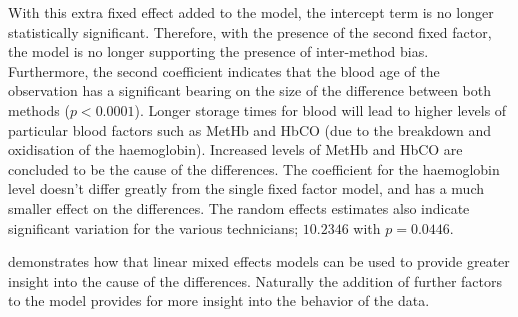 \documentclass[12pt, a4paper]{report}
\begin{document}
With this extra fixed effect added to the model, the intercept
term is no longer statistically significant. Therefore, with the
presence of the second fixed factor, the model is no longer
supporting the presence of inter-method bias. Furthermore, the
second coefficient indicates that the blood age of the observation
has a significant bearing on the size of the difference between
both methods ($p <0.0001$). Longer storage times for blood will
lead to higher levels of particular blood factors such as MetHb
and HbCO (due to the breakdown and oxidisation of the
haemoglobin). Increased levels of MetHb and HbCO are concluded to
be the cause of the differences. The coefficient for the
haemoglobin level doesn't differ greatly from the single fixed
factor model, and has a much smaller effect on the differences.
The random effects estimates also indicate significant variation
for the various technicians; $10.2346$ with $p=0.0446$.

\citet{LaiShiao} demonstrates how that linear mixed effects models
can be used to provide greater insight into the cause of the
differences. Naturally the addition of further factors to the
model provides for more insight into the behavior of the data.













\end{document}
